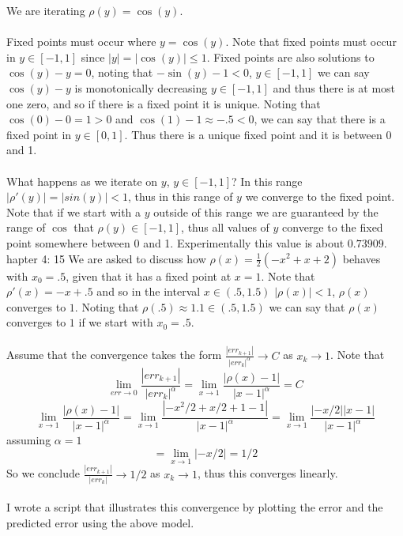 \documentclass[12pt]{article}
\makeatletter
\theoremstyle{homework}
\newenvironment{exercise}[1]
{\def\@currentlabel{#1}\exercisecore}
{\endexercisecore}
\makeatother
\begin{document}
We are iterating $\rho(y)=\cos(y)$.\\\\
Fixed points must occur where $y=\cos(y)$.  Note that fixed points must occur in $y\in [-1,1]$ since $|y|=|\cos(y)|\leq 1$.  Fixed points are also solutions to $\cos(y)-y=0$, noting that $-\sin(y)-1<0$, $y\in[-1,1]$ we can say $\cos(y)-y$ is monotonically decreasing $y\in[-1,1]$ and thus there is at most one zero, and so if there is a fixed point it is unique.  Noting that $\cos(0)-0=1>0$ and $\cos(1)-1\approx -.5<0$, we can say that there is a fixed point in $y\in[0,1]$.  Thus there is a unique fixed point and it is between 0 and 1.\\\\
What happens as we iterate on $y$, $y\in [-1,1]$?  In this range $|\rho'(y)|=|sin(y)|<1$, thus in this range of $y$ we converge to the fixed point.  Note that if we start with a $y$ outside of this range we are guaranteed by the range of $\cos$ that $\rho(y)\in[-1,1]$, thus all values of $y$ converge to the fixed point somewhere between 0 and 1.  Experimentally this value is about $0.73909$.
\begin{exercise}

Chapter 4: 15
\end{exercise}
We are asked to discuss how $\rho(x)=\frac{1}{2}(-x^2+x+2)$ behaves with $x_0=.5$, given that it has a fixed point at $x=1$.  Note that $\rho'(x)=-x+.5$ and so in the interval $x\in(.5,1.5)$ $|\rho(x)|<1$, $\rho(x)$ converges to $1$.  Noting that $\rho(.5)\approx 1.1\in(.5,1.5)$ we can say that $\rho(x)$ converges to $1$ if we start with $x_0=.5$.\\\\
Assume that the convergence takes the form $\frac{|err_{k+1}|}{|err_k|^\alpha}\rightarrow C$ as $x_k\rightarrow 1$.  Note that $$\lim_{err\rightarrow 0}\frac{|err_{k+1}|}{|err_k|^\alpha}=\lim_{x\rightarrow 1}\frac{|\rho(x)-1|}{|x-1|^\alpha}=C$$
$$\lim_{x\rightarrow 1}\frac{|\rho(x)-1|}{|x-1|^\alpha}=
\lim_{x\rightarrow 1}\frac{|-x^2/2+x/2+1-1|}{|x-1|^\alpha}=
\lim_{x\rightarrow 1}\frac{|-x/2||x-1|}{|x-1|^\alpha}$$
assuming $\alpha=1$
$$=\lim_{x\rightarrow 1}|-x/2|=1/2$$
So we conclude $\frac{|err_{k+1}|}{|err_k|}\rightarrow 1/2$ as $x_k\rightarrow 1$, thus this converges linearly.\\\\
I wrote a script that illustrates this convergence by plotting the error and the predicted error using the above model.\\
\end{document}
